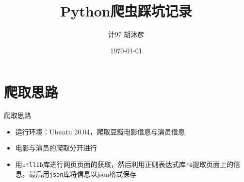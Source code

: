 \documentclass{ctexbeamer}
\title{Python爬虫踩坑记录}
\date{\today}
\author[胡沐彦]{计97 胡沐彦}
\begin{document}
\begin{frame}
	\titlepage
\end{frame}

\section{爬取思路}
\begin{frame}{爬取思路}
	\begin{itemize}
		\item 运行环境：Ubuntu 20.04，爬取豆瓣电影信息与演员信息
		\pause \item 电影与演员的爬取分开进行
		\pause \item 用\texttt{urllib}库进行网页页面的获取，然后利用正则表达式库\texttt{re}提取页面上的信息，最后用\texttt{json}库将信息以json格式保存
	\end{itemize}
\end{frame}
\end{document}
